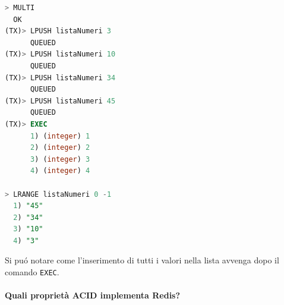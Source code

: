 \begin{lstlisting}[autogobble, style=redis-cli, language=SQL]
> MULTI
  OK
(TX)> LPUSH listaNumeri 3
      QUEUED
(TX)> LPUSH listaNumeri 10
      QUEUED
(TX)> LPUSH listaNumeri 34
      QUEUED
(TX)> LPUSH listaNumeri 45
      QUEUED
(TX)> EXEC
      1) (integer) 1
      2) (integer) 2
      3) (integer) 3
      4) (integer) 4

> LRANGE listaNumeri 0 -1
  1) "45"
  2) "34"
  3) "10"
  4) "3"\end{lstlisting}
Si puó notare come l'inserimento di tutti i valori nella lista avvenga dopo il comando \texttt{EXEC}.\\
\paragraph{Quali proprietà ACID implementa Redis?}
